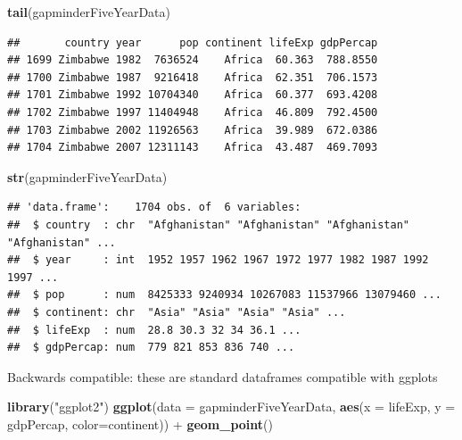 \documentclass[]{article}
\newenvironment{Shaded}{\begin{snugshade}}{\end{snugshade}}
\newcommand{\KeywordTok}[1]{\textcolor[rgb]{0.13,0.29,0.53}{\textbf{{#1}}}}
\newcommand{\DataTypeTok}[1]{\textcolor[rgb]{0.13,0.29,0.53}{{#1}}}
\newcommand{\StringTok}[1]{\textcolor[rgb]{0.31,0.60,0.02}{{#1}}}
\newcommand{\NormalTok}[1]{{#1}}
\begin{document}
\begin{Shaded}
\begin{Highlighting}[]
\KeywordTok{tail}\NormalTok{(gapminderFiveYearData)}
\end{Highlighting}
\end{Shaded}

\begin{verbatim}
##       country year      pop continent lifeExp gdpPercap
## 1699 Zimbabwe 1982  7636524    Africa  60.363  788.8550
## 1700 Zimbabwe 1987  9216418    Africa  62.351  706.1573
## 1701 Zimbabwe 1992 10704340    Africa  60.377  693.4208
## 1702 Zimbabwe 1997 11404948    Africa  46.809  792.4500
## 1703 Zimbabwe 2002 11926563    Africa  39.989  672.0386
## 1704 Zimbabwe 2007 12311143    Africa  43.487  469.7093
\end{verbatim}

\begin{Shaded}
\begin{Highlighting}[]
\KeywordTok{str}\NormalTok{(gapminderFiveYearData)}
\end{Highlighting}
\end{Shaded}

\begin{verbatim}
## 'data.frame':    1704 obs. of  6 variables:
##  $ country  : chr  "Afghanistan" "Afghanistan" "Afghanistan" "Afghanistan" ...
##  $ year     : int  1952 1957 1962 1967 1972 1977 1982 1987 1992 1997 ...
##  $ pop      : num  8425333 9240934 10267083 11537966 13079460 ...
##  $ continent: chr  "Asia" "Asia" "Asia" "Asia" ...
##  $ lifeExp  : num  28.8 30.3 32 34 36.1 ...
##  $ gdpPercap: num  779 821 853 836 740 ...
\end{verbatim}

Backwards compatible: these are standard dataframes compatible with
ggplots

\begin{Shaded}
\begin{Highlighting}[]
\KeywordTok{library}\NormalTok{(}\StringTok{"ggplot2"}\NormalTok{)}
\KeywordTok{ggplot}\NormalTok{(}\DataTypeTok{data =} \NormalTok{gapminderFiveYearData, }\KeywordTok{aes}\NormalTok{(}\DataTypeTok{x =} \NormalTok{lifeExp, }\DataTypeTok{y =} \NormalTok{gdpPercap, }\DataTypeTok{color=}\NormalTok{continent)) +}
\StringTok{  }\KeywordTok{geom_point}\NormalTok{()}
\end{Highlighting}
\end{Shaded}
\end{document}
